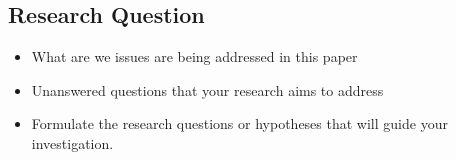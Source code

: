 \documentclass[report.tex]{subfiles}
\begin{document}
    \subsection{Research Question}
    \begin{itemize}
        \item What are we issues are being addressed in this paper
        \item Unanswered questions that your research aims to address
        \item Formulate the research questions or hypotheses that will guide your investigation.
    \end{itemize}
\end{document}

